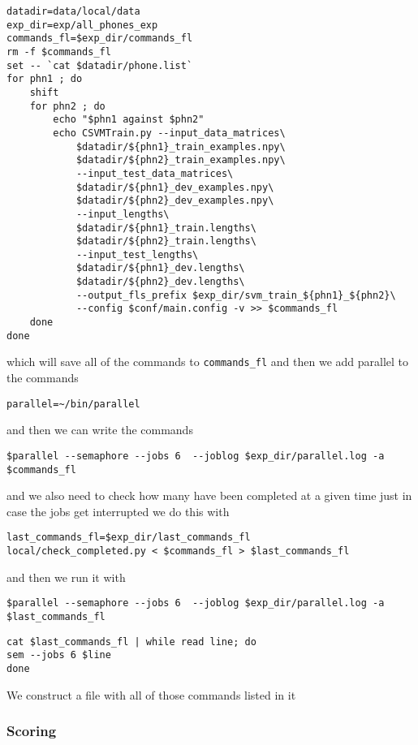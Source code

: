 \documentclass{article}
\begin{document}
\begin{verbatim}
datadir=data/local/data
exp_dir=exp/all_phones_exp
commands_fl=$exp_dir/commands_fl
rm -f $commands_fl
set -- `cat $datadir/phone.list`
for phn1 ; do
    shift
    for phn2 ; do
        echo "$phn1 against $phn2"
        echo CSVMTrain.py --input_data_matrices\
            $datadir/${phn1}_train_examples.npy\
            $datadir/${phn2}_train_examples.npy\
            --input_test_data_matrices\
            $datadir/${phn1}_dev_examples.npy\
            $datadir/${phn2}_dev_examples.npy\
            --input_lengths\
            $datadir/${phn1}_train.lengths\
            $datadir/${phn2}_train.lengths\
            --input_test_lengths\
            $datadir/${phn1}_dev.lengths\
            $datadir/${phn2}_dev.lengths\
            --output_fls_prefix $exp_dir/svm_train_${phn1}_${phn2}\
            --config $conf/main.config -v >> $commands_fl
    done
done
\end{verbatim}
which will save all of the commands to
\texttt{commands_fl}
and then we add parallel to the commands
\begin{verbatim}
parallel=~/bin/parallel
\end{verbatim}
and then we can write the commands
\begin{verbatim}
$parallel --semaphore --jobs 6  --joblog $exp_dir/parallel.log -a $commands_fl
\end{verbatim}
and we also need to check how many have been completed at a given
time just in case the jobs get interrupted
we do this with
\begin{verbatim}
last_commands_fl=$exp_dir/last_commands_fl
local/check_completed.py < $commands_fl > $last_commands_fl
\end{verbatim}
and then we run it with
\begin{verbatim}
$parallel --semaphore --jobs 6  --joblog $exp_dir/parallel.log -a $last_commands_fl
\end{verbatim}
\begin{verbatim}
cat $last_commands_fl | while read line; do
sem --jobs 6 $line
done

\end{verbatim}
We construct a file with all of those commands listed in it 

\subsubsection{Scoring}
\end{document}
